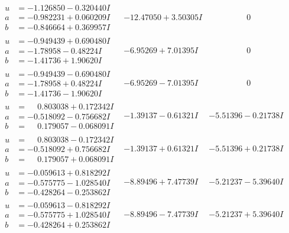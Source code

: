 \documentclass[1p]{elsarticle_modified}
\theoremstyle{definition}
\begin{document}
$$\begin{array}{c|c|c}
\begin{aligned}
u &= -1.126850 - 0.320440 I \\
a &= -0.982231 + 0.060209 I \\
b &= -0.846664 + 0.369957 I\end{aligned}
 & -12.47050 + 3.50305 I & \phantom{-0.000000 } 0 \\ \hline\begin{aligned}
u &= -0.949439 + 0.690480 I \\
a &= -1.78958 - 0.48224 I \\
b &= -1.41736 + 1.90620 I\end{aligned}
 & -6.95269 + 7.01395 I & \phantom{-0.000000 } 0 \\ \hline\begin{aligned}
u &= -0.949439 - 0.690480 I \\
a &= -1.78958 + 0.48224 I \\
b &= -1.41736 - 1.90620 I\end{aligned}
 & -6.95269 - 7.01395 I & \phantom{-0.000000 } 0 \\ \hline\begin{aligned}
u &= \phantom{-}0.803038 + 0.172342 I \\
a &= -0.518092 - 0.756682 I \\
b &= \phantom{-}0.179057 - 0.068091 I\end{aligned}
 & -1.39137 - 0.61321 I & -5.51396 - 0.21738 I \\ \hline\begin{aligned}
u &= \phantom{-}0.803038 - 0.172342 I \\
a &= -0.518092 + 0.756682 I \\
b &= \phantom{-}0.179057 + 0.068091 I\end{aligned}
 & -1.39137 + 0.61321 I & -5.51396 + 0.21738 I \\ \hline\begin{aligned}
u &= -0.059613 + 0.818292 I \\
a &= -0.575775 - 1.028540 I \\
b &= -0.428264 - 0.253862 I\end{aligned}
 & -8.89496 + 7.47739 I & -5.21237 - 5.39640 I \\ \hline\begin{aligned}
u &= -0.059613 - 0.818292 I \\
a &= -0.575775 + 1.028540 I \\
b &= -0.428264 + 0.253862 I\end{aligned}
 & -8.89496 - 7.47739 I & -5.21237 + 5.39640 I \\ \hline\begin{aligned}

\end{aligned}
\end{array}$$
\end{document}
